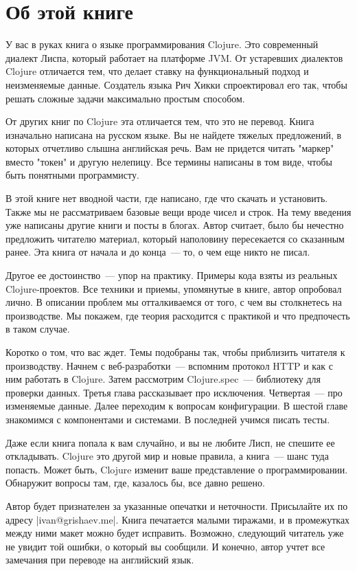 \chapter{Об этой книге}

У вас в руках книга о языке программирования Clojure. Это современный диалект
Лиспа, который работает на платформе JVM. От устаревших диалектов Clojure
отличается тем, что делает ставку на функциональный подход и неизменяемые
данные. Создатель языка Рич Хикки спроектировал его так, чтобы решать сложные
задачи максимально простым способом.

От других книг по Clojure эта отличается тем, что это не перевод. Книга
изначально написана на русском языке. Вы не найдете тяжелых предложений, в
которых отчетливо слышна английская речь. Вам не придется читать "маркер" вместо
"токен" и другую нелепицу. Все термины написаны в том виде, чтобы быть понятными
программисту.

В этой книге нет вводной части, где написано, где что скачать и
установить. Также мы не рассматриваем базовые вещи вроде чисел и строк. На тему
введения уже написаны другие книги и посты в блогах. Автор считает, было бы
нечестно предложить читателю материал, который наполовину пересекается со
сказанным ранее. Эта книга от начала и до конца~--- то, о чем еще никто не писал.

Другое ее достоинство~--- упор на практику. Примеры кода взяты из реальных
Clojure-проектов. Все техники и приемы, упомянутые в книге, автор опробовал
лично. В описании проблем мы отталкиваемся от того, с чем вы столкнетесь на
производстве. Мы покажем, где теория расходится с практикой и что предпочесть в
таком случае.

Коротко о том, что вас ждет. Темы подобраны так, чтобы приблизить читателя к
производству. Начнем с веб-разработки~--- вспомним протокол HTTP и как с ним
работать в Clojure. Затем рассмотрим Clojure.spec~--- библиотеку для проверки
данных. Третья глава рассказывает про исключения. Четвертая~--- про изменяемые
данные. Далее переходим к вопросам конфигурации. В шестой главе знакомимся с
компонентами и системами. В последней учимся писать тесты.

Даже если книга попала к вам случайно, и вы не любите Лисп, не спешите ее
откладывать. Clojure это другой мир и новые правила, а книга~--- шанс туда
попасть. Может быть, Clojure изменит ваше представление о
программировании. Обнаружит вопросы там, где, казалось бы, все давно решено.

Автор будет признателен за указанные опечатки и неточности. Присылайте их по
адресу \spverb|ivan@grishaev.me|. Книга печатается малыми тиражами, и в
промежутках между ними макет можно будет исправить. Возможно, следующий читатель
уже не увидит той ошибки, о который вы сообщили. И конечно, автор учтет все
замечания при переводе на английский язык.

